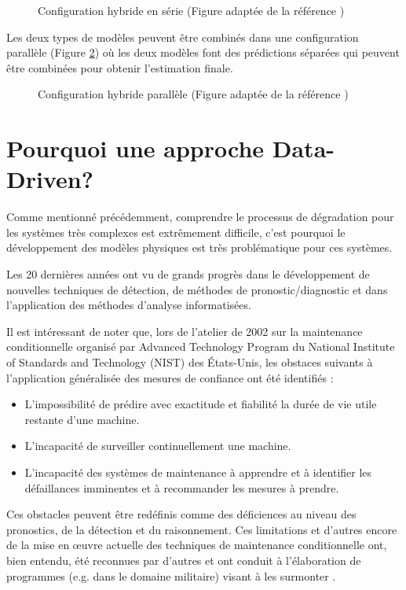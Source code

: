 \begin{figure}[H]
    \centering
    
    \caption{Configuration hybride en série (Figure adaptée de la référence \cite{Mangili2013})}
    \label{fig:hybrid-approach-series}
\end{figure}

Les deux types de modèles peuvent être combinés dans une configuration parallèle (Figure \ref{fig:hybrid-approach-parallel}) où les deux modèles font des prédictions séparées qui peuvent être combinées pour obtenir l'estimation finale.
\begin{figure}[H]
    \centering
    
    \caption{Configuration hybride parallèle (Figure adaptée de la référence \cite{Mangili2013})}
    \label{fig:hybrid-approach-parallel}
\end{figure}

\section{Pourquoi une approche Data-Driven?}
Comme mentionné précédemment, comprendre le processus de dégradation pour les systèmes très complexes est extrêmement difficile, c'est pourquoi le développement des modèles physiques est très problématique pour ces systèmes.

Les 20 dernières années ont vu de grands progrès dans le développement de nouvelles techniques de détection, de méthodes de pronostic/diagnostic et dans l’application des méthodes d’analyse informatisées. 

Il est intéressant de noter que, lors de l’atelier de 2002 sur la maintenance conditionnelle organisé par Advanced Technology Program du National Institute of Standards and Technology (NIST) des États-Unis, les obstaces suivants à l’application généralisée des mesures de confiance ont été identifiés :
\begin{itemize}%
    \item L’impossibilité de prédire avec exactitude et fiabilité la durée de vie utile restante d'une machine.
    \item L’incapacité de surveiller continuellement une machine.
    \item L’incapacité des systèmes de maintenance à apprendre et à identifier les défaillances imminentes et à recommander les mesures à prendre.
\end{itemize} 

Ces obstacles peuvent être redéfinis comme des déficiences au niveau des pronostics, de la détection et du raisonnement. Ces limitations et d'autres encore de la mise en œuvre actuelle des techniques de maintenance conditionnelle ont, bien entendu, été reconnues par d'autres et ont conduit à l'élaboration de programmes (e.g. dans le domaine militaire) visant à les surmonter \cite{Hess2008}.

